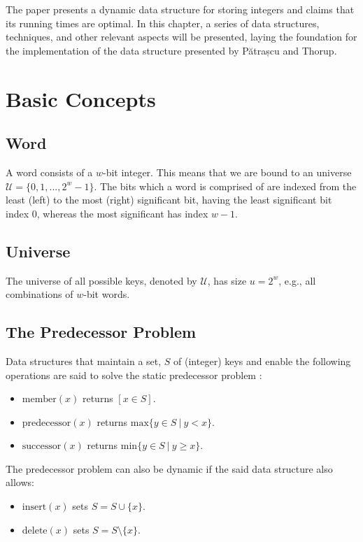 The \cite{patrascu2014dynamic} paper presents a dynamic data structure for storing integers and claims that its running times are optimal.
In this chapter, a series of data structures, techniques, and other relevant aspects will be presented, laying the foundation for the implementation of the data structure presented by Pătrașcu and Thorup.

\section{Basic Concepts}

\subsection{Word} \label{sec:word}
A word consists of a $w$-bit integer. This means that we are bound to an universe $\mathcal U = \{0, 1, ..., 2^{w}-1\}$. The bits which a word is comprised of are indexed from the least (left) to the most (right) significant bit, having the least significant bit index $0$, whereas the most significant has index $w-1$.

\subsection{Universe}
The universe of all possible keys, denoted by $\mathcal U$, has size $u = 2^{w}$, e.g., all combinations of $w$-bit words.

\subsection{The Predecessor Problem} \label{sec:predecessorProblem}
Data structures that maintain a set, $S$ of (integer) keys and enable the following operations are said to solve the static predecessor problem \cite{beame1999optimal}:
\begin{itemize}
    \item
    $\text{member}(x)$ returns $[x \in S]$.
    \item
    $\text{predecessor}(x)$ returns $\text{max}\{y\in S\ |\ y < x\}$.
    \item
    $\text{successor}(x)$ returns $\text{min}\{y\in S\ |\ y \geq x\}$.
\end{itemize}

The predecessor problem can also be dynamic \cite{beame1999optimal} if the said data structure also allows:
\begin{itemize}
    \item
    $\text{insert}(x)$ sets $S=S \cup \{x\}$.
    \item
    $\text{delete}(x)$ sets $S=S \setminus \{x\}$.
\end{itemize}

